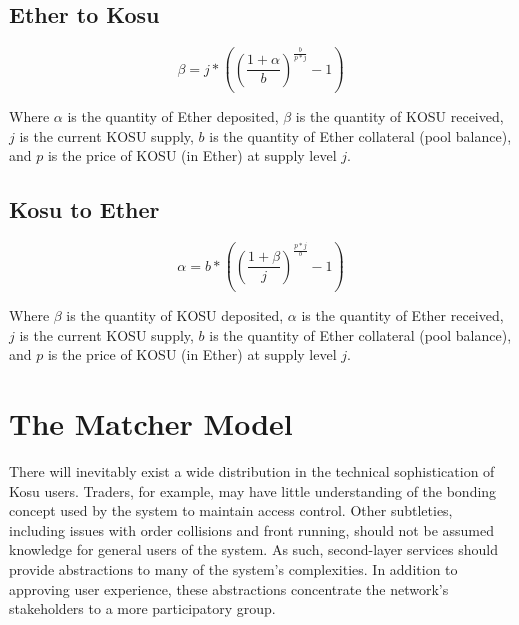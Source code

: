 \documentclass[10pt]{article}
\begin{document}
\subsection{Ether to Kosu}\label{token-distribution-eth-kosu}
\begin{equation}
  \beta = j* ((\frac{1+\alpha}{b})^{\frac{b}{p*j}} - 1)
\end{equation}
\medskip

Where $\alpha$ is the quantity of Ether deposited, $\beta$ is the quantity of KOSU received, $j$ is the current KOSU supply, $b$ is the quantity of Ether collateral (pool balance), and $p$ is the price of KOSU (in Ether) at supply level $j$. 
\subsection{Kosu to Ether}\label{token-distribution-kosu-eth}
\begin{equation}
  \alpha = b* ((\frac{1+\beta}{j})^{\frac{p*j}{b}} - 1)
\end{equation}
\medskip

Where $\beta$ is the quantity of KOSU deposited, $\alpha$ is the quantity of Ether received, $j$ is the current KOSU supply, $b$ is the quantity of Ether collateral (pool balance), and $p$ is the price of KOSU (in Ether) at supply level $j$. 
\clearpage
\pagebreak


\section{The Matcher Model}\label{matcher-model}
There will inevitably exist a wide distribution in the technical sophistication of Kosu users. Traders, for example, may have little understanding of the bonding concept used by the system to maintain access control. Other subtleties, including issues with order collisions and front running, should not be assumed knowledge for general users of the system. As such, second-layer services should provide abstractions to many of the system’s complexities. In addition to approving user experience, these abstractions concentrate the network's stakeholders to a more participatory group.
\medskip 
\end{document}
